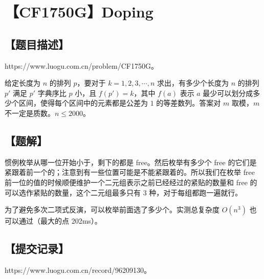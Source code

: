\documentclass[UTF8,12pt,a4paper]{ctexart}
\begin{document}
	\section*{【CF1750G】Doping}
	
	\subsection*{【题目描述】}
	
	https://www.luogu.com.cn/problem/CF1750G。
	
	给定长度为 $n$ 的排列 $p$，要对于 $k=1,2,3,\cdots,n$ 求出，有多少个长度为 $n$ 的排列 $p'$ 满足 $p'$ 字典序比 $p$ 小，且 $f(p')=k$，其中 $f(a)$ 表示 $a$ 最少可以划分成多少个区间，使得每个区间中的元素都是公差为 $1$ 的等差数列。答案对 $m$ 取模，$m$ 不一定是质数。$n\le 2000$。
	
	\subsection*{【题解】}
	
	惯例枚举从哪一位开始小于，剩下的都是 free。然后枚举有多少个 free 的它们是紧跟着前一个的；注意到有一些位置可能是不能紧跟着的。所以我们在枚举 free 前一位的值的时候顺便维护一个二元组表示之前已经经过的紧贴的数量和 free 的可以选作紧贴的数量，这个二元组最多只有 $3$ 种，对于每组都跑一遍就行。
	
	为了避免多次二项式反演，可以枚举前面选了多少个。实测总复杂度 $O(n^3)$ 也可以通过（最大的点 202ms）。
	
	\subsection*{【提交记录】}
	
	https://www.luogu.com.cn/record/96209130。
	
	
\end{document}
